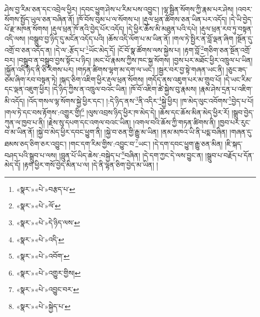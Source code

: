 ཤེས་བྱ་རིམ་ཅན་དང་འབྲེལ་ཕྱིར། །དབང་ཕྱུག་ཤེས་པ་རིམ་པས་འབྱུང་། །ལྷ་སྦྱིན་སོགས་ཀྱི་རྣམ་པར་ཤེས། །འབར་སོགས་སྤྱོད་ཡུལ་ཅན་བཞིན་ནོ། །ཁོ་བོས་བུམ་པ་ལ་སོགས་པ། །རྡུལ་ཕྲན་ཚོགས་ཅན་ཡིན་པར་འདོད། །དེ་ཡི་བྱེད་པོ་རྫ་མཁན་སོགས། །རྡུལ་ཕྲན་ཁོ་ནའི་བྱེད་པོར་འདོད། །དེ་ཕྱིར་ཆོས་མི་མཐུན་པའི་དཔེ། །རྡུལ་ཕྲན་རབ་ཏུ་བསྟན་འདི་ལས། །བསྒྲུབ་བྱ་ཉིད་དུ་མངོན་འདོད་པའི། །ཆོས་འདི་ལོག་པ་མ་ཡིན་ནོ། །གལ་ཏེ་སྤྱིར་ན་བློ་ལྡན་ཞིག །སྔོན་དུ་འགྲོ་བ་ཅན་འདོད་ན། །དེ་ལ་:རྩོད་པ་\footnote{«སྣར་»«པེ་»བརྩད་པ་}ཡོང་མེད་དོ། །ངོ་བོ་སྣ་ཚོགས་ལས་སྐྱེས་པ། །རྟག་བློ་\footnote{«སྣར་»«པེ་»ལོ་}གཅིག་ཅན་སྔོན་འགྲོ་བར། །བསྒྲུབ་ན་བསྒྲུབ་བྱས་སྟོང་པ་ཉིད། །མང་པོ་རྣམས་ཀྱིས་ཁང་སྐྱ་སོགས། །བྱས་པར་མཐོང་ཕྱིར་འཁྲུལ་པ་ཡིན། །སྐྱོན་འདི་ཉིད་ནི་ཅི་རིགས་པར། །གཏན་ཚིགས་ལྷག་མ་དག་ལ་ཡང་། །སྦྱར་བར་བྱ་སྟེ་གཞན་ཡང་ནི། །ཅུང་ཟད་ཙམ་ཞིག་རབ་བསྟན་ཏེ། །སྐད་ཅིག་འཇིག་ཕྱིར་རྡུལ་ཕྲན་སོགས། །གདོད་ནས་འཇུག་པར་མ་གྲུབ་པོ། །དེ་ཡང་རིམ་དང་ལྡན་འཇུག་ཕྱིར། །དེ་ཉིད་ཀྱིས་ན་འཁྲུལ་བའང་ཡིན། །ཁོ་བོ་འཇིག་ཚེ་སྐྱེས་བུ་རྣམས། །རྣམ་ཤེས་དྲན་པ་འཇིག་མི་འདོད། །འོད་གསལ་ལྷ་སོགས་སྐྱེ་ཕྱིར་དང་། །:དེ་ཉིད་ནས་\footnote{«སྣར་»«པེ་»དེ་ཉིད་ལས་}ནི་འདིར་\footnote{«སྣར་»«པེ་»འདི་}སྐྱེ་ཕྱིར། །ཁ་མེད་ལུང་འབོགས་\footnote{«སྣར་»«པེ་»འབོག་}བྱེད་པ་པོ། །གལ་ཏེ་དང་བས་རྟོགས་:འགྱུར་གྱི།\footnote{«སྣར་»«པེ་»འགྱུར་གྱིས།} །ལུས་འབྲས་ཉིད་ཕྱིར་ཁ་མེད་དེ། །ཆོས་དང་ཆོས་མིན་མེད་ཕྱིར་རོ། །སྒྲུབ་བྱེད་ཀུན་ལ་ཁྱབ་པ་ནི། །རྗེས་སུ་དཔག་དང་འགལ་བའང་ཡིན། །འགལ་བའི་ཆོས་ཀྱི་གཏན་ཚིགས་ནི། །ཁྱབ་པར་རུང་བ་མ་ཡིན་ནོ། །སྐྱེ་བ་མེད་ཕྱིར་དབང་ཕྱུག་ནི། །སྐྱེ་བ་ཅན་གྱི་རྒྱུ་མ་ཡིན། །ནམ་མཁའ་ཡི་ནི་པདྨ་བཞིན། །གཞན་དུ་ཐམས་ཅད་ཅིག་ཅར་འབྱུང་། །གང་དག་རིམ་གྱིས་:འབྱུང་བ་\footnote{«སྣར་»«པེ་»འབྱུང་བར་}ཡང་། །དེ་དག་དབང་ཕྱུག་རྒྱུ་ཅན་མིན། །ཇི་སྐད་བཤད་པའི་སྒྲུབ་པ་ལས། །བླུན་པོ་ཡིད་ཆེས་:བསྐྱེད་པ་\footnote{«སྣར་»«པེ་»སྐྱེད་པ་}བཞིན། །དེ་དག་ཀྱང་དེ་ལས་བྱུང་ན། །སྒྲུབ་པ་བརྗོད་པ་དོན་མེད་དོ། །རྟག་ཕྱིར་གསོ་བྱེད་མིན་པ་ལ། །དེ་ནི་ལྷན་ཅིག་བྱེད་མ་ཡིན། །
